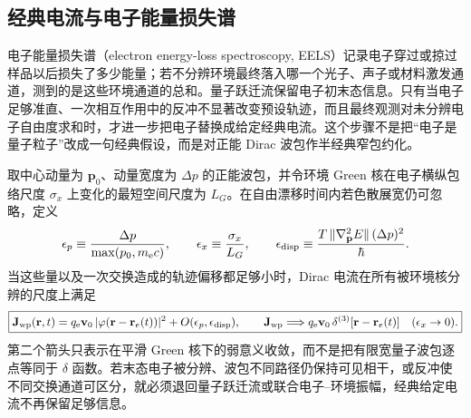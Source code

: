 \subsection{经典电流与电子能量损失谱}

电子能量损失谱（electron energy-loss spectroscopy, EELS）记录电子穿过或掠过样品以后损失了多少能量；若不分辨环境最终落入哪一个光子、声子或材料激发通道，测到的是这些环境通道的总和。量子跃迁流保留电子初末态信息。只有当电子足够准直、一次相互作用中的反冲不显著改变预设轨迹，而且最终观测对未分辨电子自由度求和时，才进一步把电子替换成给定经典电流。这个步骤不是把“电子是量子粒子”改成一句经典假设，而是对正能 Dirac 波包作半经典窄包约化。

取中心动量为 $\mathbf p_0$、动量宽度为 $\Delta p$ 的正能波包，并令环境 Green 核在电子横纵包络尺度 $\sigma_x$ 上变化的最短空间尺度为 $L_G$。在自由漂移时间内若色散展宽仍可忽略，定义
\begin{equation*}
\epsilon_p\equiv\frac{\Delta p}{\max(p_0,m_{\mathrm e} c)},
\qquad
\epsilon_x\equiv\frac{\sigma_x}{L_G},
\qquad
\epsilon_{\rm disp}\equiv\frac{T\,\|\nabla_{\mathbf p}^2E\|\,(\Delta p)^2}{\hbar}.
\end{equation*}
当这些量以及一次交换造成的轨迹偏移都足够小时，Dirac 电流在所有被环境核分辨的尺度上满足
\begin{equation}
\boxed{
\mathbf J_{\rm wp}(\mathbf r,t)
=q_{\mathrm e}\mathbf v_0\,|\varphi(\mathbf r-\mathbf r_e(t))|^2
+O(\epsilon_p,\epsilon_{\rm disp}),
\qquad
\mathbf J_{\rm wp}\Longrightarrow q_{\mathrm e}\mathbf v_0\,\delta^{(3)}[\mathbf r-\mathbf r_e(t)]
\quad(\epsilon_x\to0).}
\label{eq:quantum_wavepacket_to_classical_current_control}
\end{equation}
第二个箭头只表示在平滑 Green 核下的弱意义收敛，而不是把有限宽量子波包逐点等同于 $\delta$ 函数。若末态电子被分辨、波包不同路径仍保持可见相干，或反冲使不同交换通道可区分，就必须退回量子跃迁流或联合电子--环境振幅，经典给定电流不再保留足够信息。

